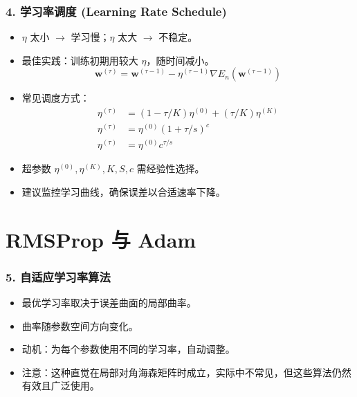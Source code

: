 \documentclass[t,aspectratio=169]{beamer} %
\begin{document}
\begin{frame}
    \frametitle{4. 学习率调度 (Learning Rate Schedule)}
    \begin{itemize}
        \item $\eta$ 太小 $\rightarrow$ 学习慢；$\eta$ 太大 $\rightarrow$ 不稳定。
        \item 最佳实践：\alert{训练初期用较大 $\eta$，随时间减小}。
        \begin{equation}
        \mathbf{w}^{(\tau)} = \mathbf{w}^{(\tau-1)} - \eta^{(\tau-1)} \nabla E_n(\mathbf{w}^{(\tau-1)})
        \tag{7.35}
        \end{equation}
        \item 常见调度方式：
        \begin{align}
        \eta^{(\tau)} &= \left(1 - \tau/K\right) \eta^{(0)} + (\tau/K) \eta^{(K)} \tag{7.36} \\
        \eta^{(\tau)} &= \eta^{(0)} \left(1 + \tau/s\right)^c \tag{7.37} \\
        \eta^{(\tau)} &= \eta^{(0)} c^{\tau/s} \tag{7.38}
        \end{align}
        \item 超参数 $\eta^{(0)}, \eta^{(K)}, K, S, c$ 需\alert{经验性选择}。
        \item 建议监控\alert{学习曲线}，确保误差以合适速率下降。
    \end{itemize}
\end{frame}

\section{RMSProp 与 Adam}

\begin{frame}
    \frametitle{5. 自适应学习率算法}
    \begin{itemize}
        \item 最优学习率取决于误差曲面的\alert{局部曲率}。
        \item 曲率随参数空间方向变化。
        \item 动机：为每个参数使用\alert{不同的学习率}，自动调整。
        \item 注意：这种直觉在\alert{局部对角海森矩阵}时成立，实际中不常见，但这些算法仍然有效且广泛使用。
    \end{itemize}
\end{frame}
\end{document}
